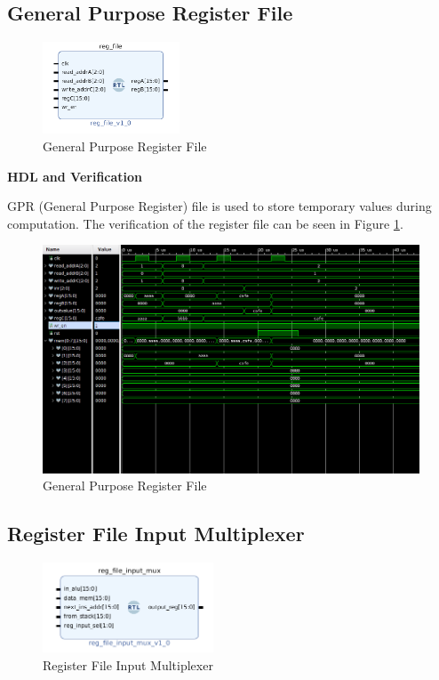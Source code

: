 \documentclass{article}
\newcommand{\stitle}{HDL and Verification}
\begin{document}
\begin{par}
	\newpage

	\subsection{General Purpose Register File}
	
	\begin{figure}[H]
		\centering
		\includegraphics[width=1.6in]{img/regFile.png}
		\caption{General Purpose Register File}
	\end{figure}
	
	\textbf{\stitle}
	\begin{par}
		GPR (General Purpose Register) file is used to store temporary values during computation. The verification of the register file can be seen in Figure \ref{fig:gprtb}.
	\end{par} 

	\begin{figure}[H]
		\centering
		\includegraphics[width=6in]{img/regFileTB.png}
		\caption{General Purpose Register File}
		\label{fig:gprtb}
	\end{figure}

	\newpage
	
	\subsection{Register File Input Multiplexer}
	
	\begin{figure}[H]
		\centering
		\includegraphics[width=2in]{img/regFileMux.png}
		\caption{Register File Input Multiplexer}
	\end{figure}
	

\end{par}
\end{document}
